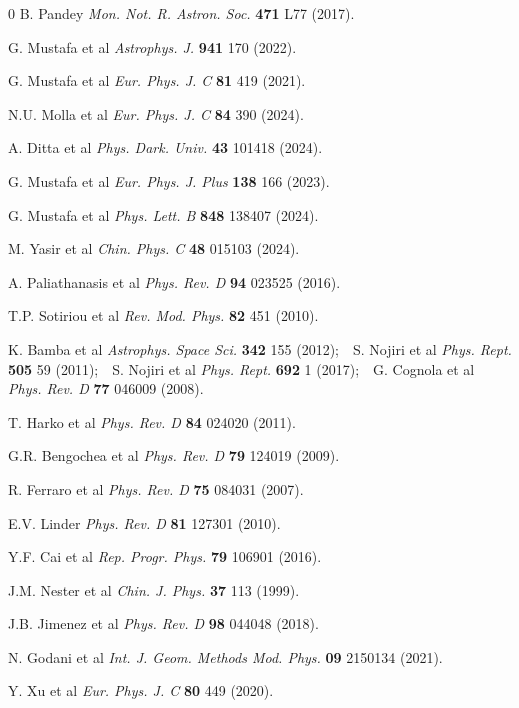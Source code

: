 \documentclass[aps,prd,showpacs,nofootinbib,floats,floatfix,preprintnumbers,groupedaddress,twocolumn]{revtex4-1}
\begin{document}
\begin{thebibliography}{0}
B. Pandey \textit{Mon. Not. R. Astron. Soc.} \textbf{471} L77 (2017).

 G. Mustafa et al \textit{Astrophys. J.} \textbf{941} 170 (2022).

 G. Mustafa et al \textit{Eur. Phys. J. C} \textbf{81} 419 (2021).

 N.U. Molla et al \textit{Eur. Phys. J. C} \textbf{84} 390 (2024).

 A. Ditta et al \textit{Phys. Dark. Univ.} \textbf{43} 101418 (2024).

 G. Mustafa et al \textit{Eur. Phys. J. Plus} \textbf{138} 166 (2023).

 G. Mustafa et al \textit{Phys. Lett. B} \textbf{848} 138407 (2024).

 M. Yasir et al \textit{Chin. Phys. C} \textbf{48} 015103 (2024).

A. Paliathanasis et al \textit{Phys. Rev. D} \textbf{94} 023525 (2016).

T.P. Sotiriou et al \textit{Rev. Mod. Phys.} \textbf{82} 451 (2010).

 K. Bamba et al \textit{Astrophys. Space Sci.} \textbf{342} 155 (2012);~~S. Nojiri et al \textit{Phys. Rept.} \textbf{505} 59 (2011);~~S. Nojiri et al \textit{Phys. Rept.} \textbf{692} 1 (2017);~~G. Cognola et al \textit{Phys. Rev. D} \textbf{77} 046009 (2008).

T. Harko et al \textit{Phys. Rev. D} \textbf{84} 024020 (2011).

G.R. Bengochea et al \textit{Phys. Rev. D} \textbf{79} 124019 (2009).

R. Ferraro et al \textit{Phys. Rev. D} \textbf{75} 084031 (2007).

E.V. Linder \textit{Phys. Rev. D} \textbf{81} 127301 (2010).

Y.F. Cai et al \textit{Rep. Progr. Phys.} \textbf{79} 106901 (2016).

J.M. Nester et al \textit{Chin. J. Phys.} \textbf{37} 113 (1999).

J.B. Jimenez et al \textit{Phys. Rev. D} \textbf{98} 044048 (2018).

N. Godani et al \textit{Int. J. Geom. Methods Mod. Phys.} \textbf{09} 2150134 (2021).

Y. Xu et al \textit{Eur. Phys. J. C} \textbf{80} 449 (2020).


\end{thebibliography}
\end{document}
